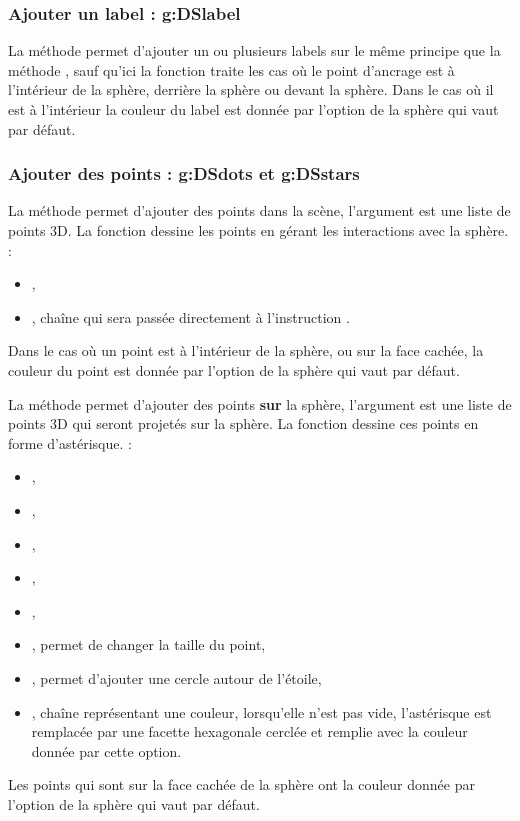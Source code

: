 \subsubsection{Ajouter un label : g:DSlabel}

La méthode  permet d'ajouter un ou plusieurs labels sur le même principe que la méthode , sauf qu'ici la fonction traite les cas où le point d'ancrage est à l'intérieur de la sphère, derrière la sphère ou devant la sphère. Dans le cas où il est à l'intérieur la couleur du label est donnée par l'option de la sphère  qui vaut  par défaut.

\subsubsection{Ajouter des points : g:DSdots et g:DSstars}

La méthode  permet d'ajouter des points dans la scène, l'argument  est une liste de points 3D. La fonction dessine les points en gérant les interactions avec la sphère. \writeoptions :
    \begin{itemize}
        \item {},
        \item {}, chaîne qui sera passée directement à l'instruction \drawcmd.
    \end{itemize}
Dans le cas où un point est à l'intérieur de la sphère, ou sur la face cachée, la couleur du point est donnée par l'option de la sphère  qui vaut  par défaut.

La méthode  permet d'ajouter des points \textbf{sur} la sphère, l'argument  est une liste de points 3D qui seront projetés sur la sphère. La fonction dessine ces points en forme d'astérisque. \writeoptions :
    \begin{itemize}
        \item {}, 
        \item {},
        \item {},
        \item {},
        \item {},
        \item {}, permet de changer la taille du point,
        \item {}, permet d'ajouter une cercle autour de l'étoile,
        \item {}, chaîne représentant une couleur, lorsqu'elle n'est pas vide, l'astérisque est remplacée par une facette hexagonale cerclée et remplie avec la couleur donnée par cette option.
    \end{itemize}   
Les points qui sont sur la face cachée de la sphère ont la couleur donnée par l'option de la sphère  qui vaut  par défaut.

